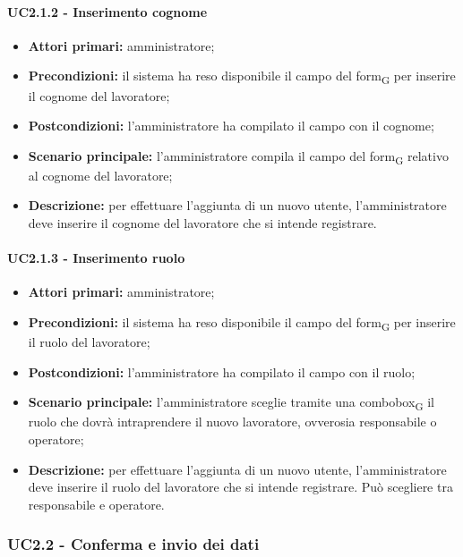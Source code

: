 \paragraph{UC2.1.2 - Inserimento cognome}

\begin{itemize}
	\item 	\textbf{Attori primari:} amministratore;
	\item 	\textbf{Precondizioni:} il sistema ha reso disponibile il campo del \gls{form}\textsubscript{G} per inserire il cognome del lavoratore;
	\item 	\textbf{Postcondizioni:} l'amministratore ha compilato il campo con il cognome;
	\item 	\textbf{Scenario principale:} l'amministratore compila il campo del \gls{form}\textsubscript{G} relativo al cognome del lavoratore;
	\item 	\textbf{Descrizione:} per effettuare l'aggiunta di un nuovo utente, l'amministratore deve inserire il cognome del lavoratore che si intende registrare.
	
\end{itemize}

\paragraph{UC2.1.3 - Inserimento ruolo}

\begin{itemize}
	\item 	\textbf{Attori primari:} amministratore;
	\item 	\textbf{Precondizioni:} il sistema ha reso disponibile il campo del \gls{form}\textsubscript{G} per inserire il ruolo del lavoratore;
	\item 	\textbf{Postcondizioni:} l'amministratore ha compilato il campo con il ruolo;
	\item 	\textbf{Scenario principale:} l'amministratore sceglie tramite una \gls{combobox}\textsubscript{G} il ruolo che dovrà intraprendere il nuovo lavoratore, ovverosia responsabile o operatore;
	\item 	\textbf{Descrizione:} per effettuare l'aggiunta di un nuovo utente, l'amministratore deve inserire il ruolo del lavoratore che si intende registrare. Può scegliere tra responsabile e operatore.
	
\end{itemize}


\subsubsection{UC2.2 - Conferma e invio dei dati}

